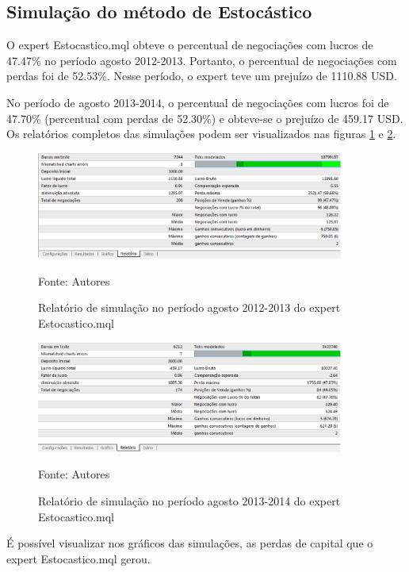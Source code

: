 \subsection{Simulação do método de Estocástico}

O expert Estocastico.mql obteve o percentual de negociações com lucros de 47.47\% no período agosto 2012-2013. Portanto, o percentual de negociações com perdas foi de 52.53\%. Nesse período, o expert teve um prejuízo de 1110.88 USD.

No período de agosto 2013-2014, o percentual de negociações com lucros foi de 47.70\% (percentual com perdas de 52.30\%)  e obteve-se o prejuízo de 459.17 USD. 
Os relatórios completos das simulações podem ser visualizados nas figuras \ref{protocoloEst} e \ref{protocoloEst2}.

\begin{figure}[htp]
\centering
\includegraphics[width=0.9\textwidth]{figuras/protocoloEst}
\caption{Relatório de simulação no período agosto 2012-2013 do expert Estocastico.mql}{Fonte: Autores} 
\label{protocoloEst}
\end{figure}

\begin{figure}[htp]
\centering
\includegraphics[width=0.9\textwidth]{figuras/protocoloEst2}
\caption{Relatório de simulação no período agosto 2013-2014 do expert Estocastico.mql}{Fonte: Autores} 
\label{protocoloEst2}
\end{figure}

É possível visualizar nos gráficos das simulações, as perdas de capital que o expert Estocastico.mql gerou.

